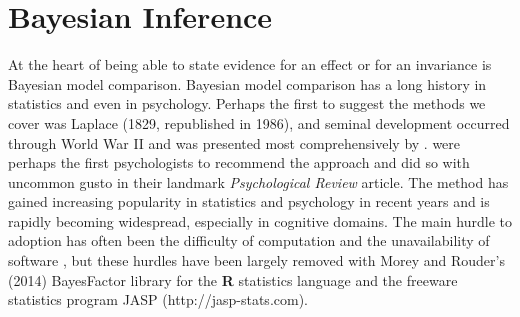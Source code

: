 \documentclass[man]{apa6}
\begin{document}
\section{Bayesian Inference}
At the heart of being able to state evidence for an effect or for an invariance is Bayesian model comparison.  Bayesian model comparison has a long history in statistics and even in psychology.  Perhaps the first to suggest the methods we cover was Laplace (1829, republished in 1986), and seminal development occurred through World War II and was presented most comprehensively by \citet{Jeffreys:1961}.  \citet{Edwards:etal:1963} were perhaps the first psychologists to recommend the approach and did so with uncommon gusto in their landmark {\em Psychological Review} article.  The method has gained increasing popularity in statistics and psychology in recent years \citep{Berger:Delampady:1987,Gallistel:2009,Raftery:1995,Rouder:etal:2009a,Wagenmakers:2007} and is rapidly becoming widespread, especially in cognitive domains. The main hurdle to adoption has often been the difficulty of computation and the unavailability of software \citep{Gallistel:2009}, but these hurdles have been largely removed with Morey and Rouder's (2014) BayesFactor library for the {\bf R} statistics language and the freeware statistics program JASP (http://jasp-stats.com).

\nocite{Laplace:1986,Morey:Rouder:2014}
\end{document}
